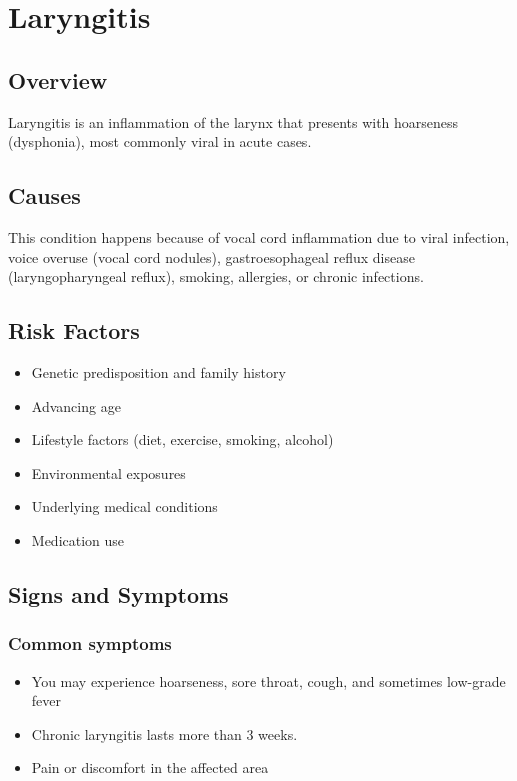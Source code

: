 \chapter{Laryngitis}
\label{sec:Laryngitis}

\section{Overview}
Laryngitis is an inflammation of the larynx that presents with hoarseness (dysphonia), most commonly viral in acute cases.
\section{Causes}
This condition happens because of vocal cord inflammation due to viral infection, voice overuse (vocal cord nodules), gastroesophageal reflux disease (laryngopharyngeal reflux), smoking, allergies, or chronic infections.     
\section{Risk Factors}

\begin{itemize}[noitemsep]
  \item Genetic predisposition and family history
  \item Advancing age
  \item Lifestyle factors (diet, exercise, smoking, alcohol)
  \item Environmental exposures
  \item Underlying medical conditions
  \item Medication use
\end{itemize}
\section{Signs and Symptoms}

\subsection{Common symptoms}
\begin{itemize}[noitemsep]
  \item You may experience hoarseness, sore throat, cough, and sometimes low-grade fever
  \item Chronic laryngitis lasts more than 3 weeks.
  \item Pain or discomfort in the affected area
  \end{itemize}

